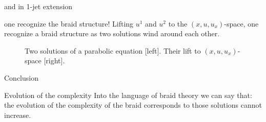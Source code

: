 \documentclass[9pt, english]{beamer}
\theoremstyle{definition}
\begin{document}
\begin{frame}{and in 1-jet extension}
    \begin{block}{one recognize the braid structure!}
        Lifting $u^1$ and $u^2$ to the $(x,u, u_x)$-space, one recognize
        a braid structure as two solutions wind around each other.
        \begin{figure}\label{fig:lift}
        \caption{Two solutions of a parabolic equation [left]. Their lift to
        $(x,u,u_x)$-space [right].}
        \end{figure}
    \end{block}
\end{frame}
\begin{frame}{Conclusion}
    \begin{block}{Evolution of the complexity}
        Into the language of braid theory we can say that:\pause\\
        {\color{blue}
        {the evolution of the complexity of the braid corresponds to
        those solutions cannot increase.}\/}
    \end{block}
\end{frame}
\end{document}
